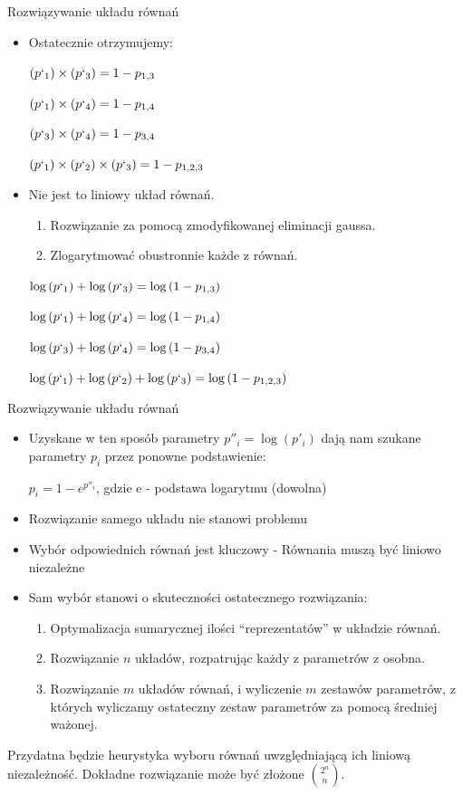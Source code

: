 \documentclass{beamer}
\begin{document}
\begin{frame}{Rozwiązywanie układu równań}
	\begin{itemize}
	\item
		Ostatecznie otrzymujemy:

		$(p`_1)\times(p`_3) = 1 - p_{1,3}$

		$(p`_1)\times(p`_4) = 1 - p_{1,4}$

		$(p`_3)\times(p`_4) = 1 - p_{3,4}$

		$(p`_1)\times(p`_2)\times(p`_3) = 1 - p_{1,2,3}$
	\item Nie jest to liniowy układ równań. 
	\begin{enumerate}
		\item Rozwiązanie za pomocą zmodyfikowanej eliminacji gaussa.
		\item Zlogarytmować obustronnie każde z równań.
	\end{enumerate}
		
		$\log{(p`_1)} + \log{(p`_3)} = \log{(1 - p_{1,3}) }$

		$\log{(p`_1)} + \log{(p`_4)} = \log{(1 - p_{1,4}) }$

		$\log{(p`_3)} + \log{(p`_4)} = \log{(1 - p_{3,4}) }$

		$\log{(p`_1)} + \log{(p`_2)} + \log{(p`_3)} = \log{(1 - p_{1,2,3}) }$

	\end{itemize}
\end{frame}

\begin{frame}{Rozwiązywanie układu równań}
	\begin{itemize}
		\item Uzyskane w ten sposób parametry $p''_i = \log{(p'_i)}$ dają nam szukane parametry $p_i$ przez ponowne podstawienie: 

		$p_i = 1 - e^{p''_i}$, gdzie e - podstawa logarytmu (dowolna)

		\item Rozwiązanie samego układu nie stanowi problemu
		\item Wybór odpowiednich równań jest kluczowy - Równania muszą być liniowo niezależne
		\item Sam wybór stanowi o skuteczności ostatecznego rozwiązania:
		\begin{enumerate}
			\item Optymalizacja sumarycznej ilości ``reprezentatów'' w układzie równań. 
			\item Rozwiązanie $n$ układów, rozpatrując każdy z parametrów z osobna.
			\item Rozwiązanie $m$ układów równań, i wyliczenie $m$ zestawów parametrów, z których wyliczamy ostateczny zestaw parametrów za pomocą średniej ważonej.
		\end{enumerate}
	\end{itemize}
	Przydatna będzie heurystyka wyboru równań uwzględniającą ich liniową niezależność. Dokładne rozwiązanie może być złożone ${2^n \choose n}$.
\end{frame}
\end{document}
